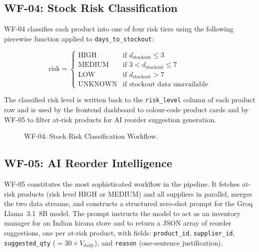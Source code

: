 \subsection{WF-04: Stock Risk Classification}

WF-04 classifies each product into one of four risk tiers using the following piecewise function
applied to \texttt{days\_to\_stockout}:

\begin{equation}
\text{risk} =
\begin{cases}
\text{HIGH}    & \text{if } d_{\text{stockout}} \leq 3 \\
\text{MEDIUM}  & \text{if } 3 < d_{\text{stockout}} \leq 7 \\
\text{LOW}     & \text{if } d_{\text{stockout}} > 7 \\
\text{UNKNOWN} & \text{if stockout data unavailable}
\end{cases}
\label{eq:risk}
\end{equation}

The classified risk level is written back to the \texttt{risk\_level} column of each product row
and is used by the frontend dashboard to colour-code product cards and by WF-05 to filter
at-risk products for AI reorder suggestion generation.

\begin{figure}[H]
\centering
{}
\caption{WF-04: Stock Risk Classification Workflow.}
\label{fig:wf04}
\end{figure}

\subsection{WF-05: AI Reorder Intelligence}

WF-05 constitutes the most sophisticated workflow in the pipeline. It fetches at-risk products
(risk level HIGH or MEDIUM) and all suppliers in parallel, merges the two data streams, and
constructs a structured zero-shot prompt for the Groq Llama~3.1~8B model. The prompt
instructs the model to act as an inventory manager for an Indian kirana store and to return
a JSON array of reorder suggestions, one per at-risk product, with fields:
\texttt{product\_id}, \texttt{supplier\_id}, \texttt{suggested\_qty}
($= 30 \times V_{\text{daily}}$), and \texttt{reason} (one-sentence justification).

